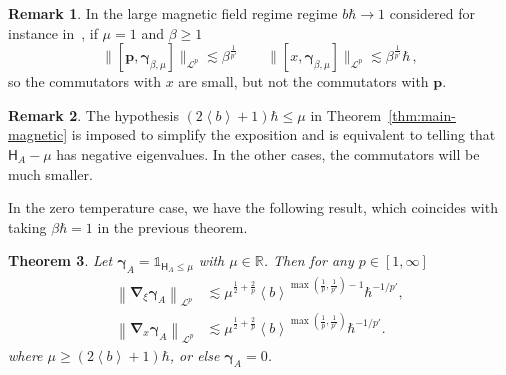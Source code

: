 \documentclass[11pt]{amsart}
\theoremstyle{plain}
\newtheorem{theorem}{Theorem}[section]
\theoremstyle{definition}
\newtheorem{remark}[theorem]{Remark}
\newcommand		{\RR}		{\mathbb R}			%
\newcommand		{\R}		{\RR}
\renewcommand	{\L}		{\mathcal L}		%
\newcommand		\sfH		{\mathsf H}			%
\newcommand		{\lt}			{\left}				%
\newcommand		{\rt}			{\right}			%
\renewcommand	{\(}			{\lt(}
\renewcommand	{\)}			{\rt)}
\newcommand		{\bangle}[1]	{\lt\langle #1\rt\rangle}
\newcommand		{\weight}[1]	{\bangle{#1}}	%
\newcommand		{\nrm}[1]		{\lt\lVert #1\rt\rVert}
\newcommand		{\bnrm}[1]		{\big\lVert #1\big\rVert}	%
\newcommand		{\Nrm}[2]		{\nrm{#1}_{#2}}
\newcommand		{\bNrm}[2]		{\bnrm{#1}_{#2}}
\newcommand		{\indic}	{\mathds{1}}		%
\newcommand		{\opgam}	{{\boldsymbol{\gamma}}}	%
\newcommand		{\opp}		{\boldsymbol{p}}
\newcommand		{\Dh}		{\boldsymbol{\nabla}}	%
\newcommand		{\Dhx}[1]	{\Dh_{\!x} #1}			%
\newcommand		{\Dhv}[1]	{\Dh_{\!\xi} #1}		%
\begin{document}
    \begin{remark}
        In the large magnetic field regime regime $b\hbar\to 1$ considered for instance in~\cite{lieb_asymptotics_1994-1, lieb_asymptotics_1994, perice_gyrokinetic_2024}, if $\mu=1$ and $\beta\geq 1$
        \begin{equation*}
            \bNrm{[\opp,\opgam_{\beta,\mu}]}{\L^p} \lesssim \beta^{\frac{1}{p'}} \qquad \bNrm{[x,\opgam_{\beta,\mu}]}{\L^p} \lesssim \beta^{\frac{1}{p'}} \hbar \, ,
        \end{equation*}
        so the commutators with $x$ are small, but not the commutators with $\opp$.
    \end{remark}

    \begin{remark}
        The hypothesis $\lt(2\weight{b}+1\rt)\hbar \leq \mu$ in Theorem~\ref{thm:main-magnetic} is imposed to simplify the exposition and is equivalent to telling that $\sfH_A-\mu$ has negative eigenvalues. In the other cases, the commutators will be much smaller.
    \end{remark}

    In the zero temperature case, we have the following result, which coincides with taking $\beta\hbar = 1$ in the previous theorem.
    \begin{theorem}\label{thm:zero-temp}
        Let $\opgam_A = \indic_{\sfH_A\leq \mu}$ with $\mu\in\R$. Then for any $p\in [1,\infty]$
		\begin{align*} %
			\Nrm{\Dhv\opgam_{A}}{\L^p} &\lesssim \mu^{\frac{1}{2}+\frac{2}{p}}  \weight{b}^{\max(\frac{1}{p},\frac{1}{p'})-1} \hbar^{-1/p'} ,
            \\
			\Nrm{\Dhx\opgam_{A}}{\L^p} &\lesssim \mu^{\frac{1}{2}+\frac{2}{p}}  \weight{b}^{\max(\frac{1}{p},\frac{1}{p'})} \hbar^{-1/p'} . %
		\end{align*}
        where $\mu\geq \lt(2\weight{b}+1\rt)\hbar$, or else $\opgam_A = 0$.
    \end{theorem}
\end{document}

